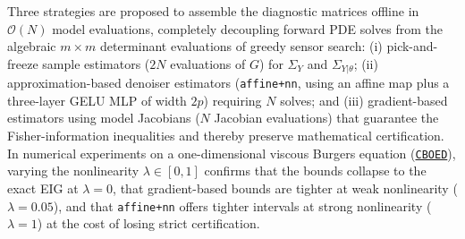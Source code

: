 \begin{itemize}
  Three strategies are proposed to assemble the diagnostic matrices offline in
  $\mathcal{O}(N)$ model evaluations, completely decoupling forward PDE solves
  from the algebraic $m \times m$ determinant evaluations of greedy sensor search:
  (i) pick-and-freeze sample estimators ($2N$ evaluations of $G$) for $\Sigma_Y$
  and $\Sigma_{Y|\theta}$; (ii) approximation-based denoiser estimators
  (\texttt{affine+nn}, using an affine map plus a three-layer GELU MLP of width $2p$)
  requiring $N$ solves; and (iii) gradient-based estimators using model Jacobians
  ($N$ Jacobian evaluations) that guarantee the Fisher-information inequalities and
  thereby preserve mathematical certification. In numerical experiments on a
  one-dimensional viscous Burgers equation (\href{https://github.com/mohamed495/CBOED}{\texttt{CBOED}}),
  varying the nonlinearity $\lambda \in [0, 1]$ confirms that the bounds collapse
  to the exact EIG at $\lambda = 0$, that gradient-based bounds are tighter at weak
  nonlinearity ($\lambda = 0.05$), and that \texttt{affine+nn} offers tighter
  intervals at strong nonlinearity ($\lambda = 1$) at the cost of losing strict
  certification.


\end{itemize}
